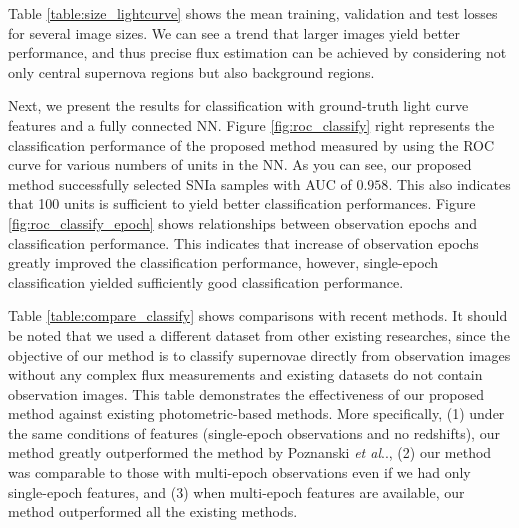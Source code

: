 \documentclass[conference,compsoc]{IEEEtran}
\makeatletter
\DeclareRobustCommand\onedot{\futurelet\@let@token\@onedot}
\def\@onedot{\ifx\@let@token.\else.\null\fi\xspace}
\def\etal{\emph{et al}\onedot}
\makeatother
\begin{document}
  Table \ref{table:size_lightcurve} shows the mean training, validation and test losses for several image sizes.
  We can see a trend that larger images yield better performance, and thus precise flux estimation can be achieved by considering not only central supernova regions but also background regions.


  Next, we present the results for classification with ground-truth light curve features and a fully connected NN.
  Figure \ref{fig:roc_classify} right represents the classification performance of the proposed method measured by using the ROC curve for various numbers of units in the NN. %
  As you can see, our proposed method successfully selected SNIa samples with AUC of $0.958$. %
  This also indicates that 100 units is sufficient to yield better classification performances.
  Figure \ref{fig:roc_classify_epoch} shows relationships between observation epochs and classification performance.
  This indicates that increase of observation epochs greatly improved the classification performance, however, single-epoch classification yielded sufficiently good classification performance.

  Table \ref{table:compare_classify} shows comparisons with recent methods.
  It should be noted that we used a different dataset from other existing researches, since the objective of our method is to classify supernovae directly from observation images without any complex flux measurements and existing datasets do not contain observation images.
  This table demonstrates the effectiveness of our proposed method against existing photometric-based methods.
  More specifically, (1) under the same conditions of features (single-epoch observations and no redshifts), our method greatly outperformed the method by Poznanski \etal \cite{Poznanski2007}, (2) our method was comparable to those with multi-epoch observations even if we had only single-epoch features, and (3) when multi-epoch features are available, our method outperformed all the existing methods.
\end{document}
